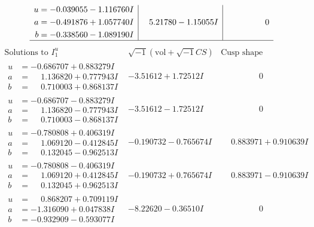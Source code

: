 \documentclass[1p]{elsarticle_modified}
\theoremstyle{definition}
\newcommand{\I}{\sqrt{-1}}
\begin{document}
$$\begin{array}{c|c|c}
\begin{aligned}
u &= -0.039055 - 1.116760 I \\
a &= -0.491876 + 1.057740 I \\
b &= -0.338560 - 1.089190 I\end{aligned}
 & \phantom{-}5.21780 - 1.15055 I & \phantom{-0.000000 } 0\\
 \hline 
 \end{array}$$\newpage$$\begin{array}{c|c|c}  
\text{Solutions to }I^u_{1}& \I (\text{vol} + \sqrt{-1}CS) & \text{Cusp shape}\\
 \hline 
\begin{aligned}
u &= -0.686707 + 0.883279 I \\
a &= \phantom{-}1.136820 + 0.777943 I \\
b &= \phantom{-}0.710003 + 0.868137 I\end{aligned}
 & -3.51612 + 1.72512 I & \phantom{-0.000000 } 0 \\ \hline\begin{aligned}
u &= -0.686707 - 0.883279 I \\
a &= \phantom{-}1.136820 - 0.777943 I \\
b &= \phantom{-}0.710003 - 0.868137 I\end{aligned}
 & -3.51612 - 1.72512 I & \phantom{-0.000000 } 0 \\ \hline\begin{aligned}
u &= -0.780808 + 0.406319 I \\
a &= \phantom{-}1.069120 - 0.412845 I \\
b &= \phantom{-}0.132045 - 0.962513 I\end{aligned}
 & -0.190732 - 0.765674 I & \phantom{-}0.883971 + 0.910639 I \\ \hline\begin{aligned}
u &= -0.780808 - 0.406319 I \\
a &= \phantom{-}1.069120 + 0.412845 I \\
b &= \phantom{-}0.132045 + 0.962513 I\end{aligned}
 & -0.190732 + 0.765674 I & \phantom{-}0.883971 - 0.910639 I \\ \hline\begin{aligned}
u &= \phantom{-}0.868207 + 0.709119 I \\
a &= -1.316090 + 0.047838 I \\
b &= -0.932909 - 0.593077 I\end{aligned}
 & -8.22620 - 0.36510 I & \phantom{-0.000000 } 0 \\ \hline\begin{aligned}

\end{aligned}
\end{array}$$
\end{document}

